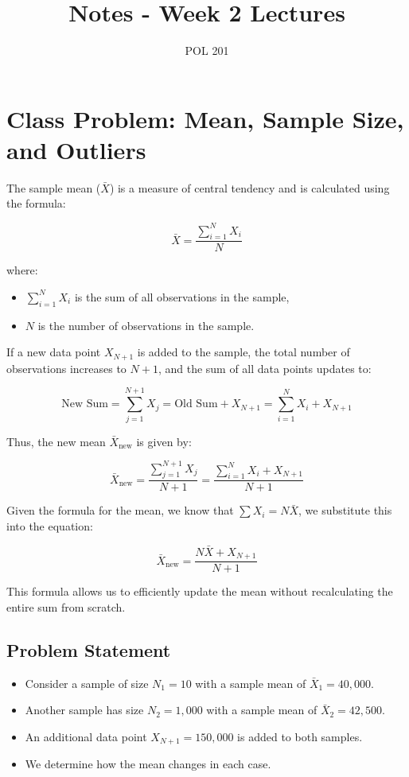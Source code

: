 \documentclass{article}
\begin{document}
\title{Notes - Week 2 Lectures}
\author{POL 201}
\date{}
\maketitle

\section{Class Problem: Mean, Sample Size, and Outliers}
The sample mean (\(\bar{X}\)) is a measure of central tendency and is calculated using the formula:

\[
\bar{X} = \frac{\sum_{i=1}^{N} X_i}{N}
\]

where:
\begin{itemize}
    \item \( \sum_{i=1}^{N} X_i \) is the sum of all observations in the sample,
    \item \( N \) is the number of observations in the sample.
\end{itemize}

If a new data point \( X_{N+1} \) is added to the sample, the total number of observations increases to \( N+1 \), and the sum of all data points updates to:

\[
\text{New Sum} = \sum_{j=1}^{N+1} X_{j} = \text{Old Sum} + X_{N+1} =   \sum_{i=1}^{N} X_i + X_{N+1}
\]

Thus, the new mean \( \bar{X}_{\text{new}} \) is given by:

\[
\bar{X}_{\text{new}} = \frac{\sum_{j=1}^{N+1} X_{j} }{N+1} = \frac{\sum_{i=1}^{N} X_i + X_{N+1}}{N+1}
\]

Given the formula for the mean, we know that \( \sum X_i = N \bar{X} \), we substitute this into the equation:

\[
\bar{X}_{\text{new}} = \frac{N \bar{X} + X_{N+1}}{N+1}
\]

This formula allows us to efficiently update the mean without recalculating the entire sum from scratch.

\subsection*{Problem Statement}
\begin{itemize}
    \item Consider a sample of size \( N_1 = 10 \) with a sample mean of \( \bar{X}_1 = 40,000 \).
    \item Another sample has size \( N_2 = 1,000 \) with a sample mean of \( \bar{X}_2 = 42,500 \).
    \item An additional data point \( X_{N+1} = 150,000 \) is added to both samples.
    \item We determine how the mean changes in each case.
\end{itemize}
\end{document}
